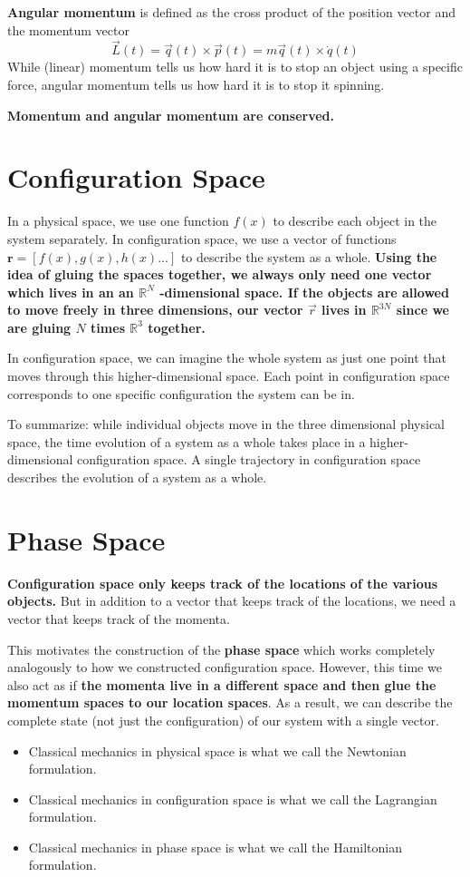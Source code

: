 \textbf{Angular momentum} is defined as the cross product of the position vector and the momentum vector
$$
\vec{L}(t)=\vec{q}(t) \times \vec{p}(t)=m \vec{q}(t) \times \dot{q}(t)
$$
While (linear) momentum tells us how hard it
is to stop an object using a specific force, angular momentum tells us how hard it is to stop it spinning.

\textbf{Momentum and angular momentum are conserved.}

\section{Configuration Space}
In a physical space, we use one function $f(x)$ to describe each object in the system separately. In configuration space, we use a vector of functions $\mathbf{r}=[f(x),g(x),h(x)...]$ to describe the system as a whole. \textbf{Using the idea of gluing the
spaces together, we always only need one vector which lives in an an $\mathbb{R}^{N}$ -dimensional space. If the objects are allowed to move freely in three dimensions, our vector $\vec{r}$ lives in $\mathbb{R}^{3 N}$ since we are gluing $ N$ times $\mathbb{R}^{3}$ together.}

In configuration space, we can imagine the whole system as just one point that moves through this higher-dimensional space. Each point in configuration space corresponds to one specific configuration the system can be in.

To summarize: while individual objects move in the three dimensional physical space, the time evolution of a system as a whole takes place in a higher-dimensional configuration space. A single trajectory in configuration space describes the evolution of a system as a whole.

\section{Phase Space}
\textbf{Configuration space only keeps track of the locations of the various objects.} But in addition to a vector that keeps track of the locations, we need a vector that keeps track of the momenta.

This motivates the construction of the  \textbf{phase space} which works completely analogously to how we constructed configuration space. However, this time we also act as if \textbf{the momenta live in a different space and then glue the momentum spaces to our location spaces}. As a result, we can describe the complete state (not just the configuration) of our system with a single vector.
\begin{qt}
\begin{itemize}
    \item Classical mechanics in physical space is what we call the Newtonian formulation.
    \item Classical mechanics in configuration space is what we call the Lagrangian formulation.
    \item Classical mechanics in phase space is what we call the Hamiltonian formulation.
\end{itemize}
\end{qt}


